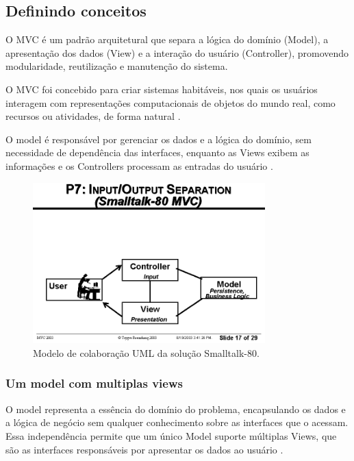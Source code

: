     \subsection{Definindo conceitos}
        \par O MVC é um padrão arquitetural que separa a lógica do domínio (Model), a apresentação dos dados (View) e a interação do usuário (Controller), promovendo modularidade, reutilização e manutenção do sistema\cite{artigo:reenskaug:2003}.

        \par O MVC foi concebido para criar sistemas habitáveis, nos quais os usuários interagem com representações computacionais de objetos do mundo real, como recursos ou atividades, de forma natural \cite{artigo:reenskaug:2003}.

        \par O model é responsável por gerenciar os dados e a lógica do domínio, sem necessidade de dependência das interfaces, enquanto as Views exibem as informações e os Controllers processam as entradas do usuário \cite{artigo:deacon:2009}.

        \begin{figure}[H] %
            \centering
            \includegraphics[width=0.8\textwidth]{figuras/figura_mvc_1.png}
            \caption{Modelo de colaboração UML da solução Smalltalk-80.}
            \label{fig:figura_mvc_1}
            \newcommand{\source}{Fonte: \cite{artigo:reenskaug:2003}}
        \end{figure}

        \subsubsection{Um model com multiplas views}
            \par O model representa a essência do domínio do problema, encapsulando os dados e a lógica de negócio sem qualquer conhecimento sobre as interfaces que o acessam. Essa independência permite que um único Model suporte múltiplas Views, que são as interfaces responsáveis por apresentar os dados ao usuário \cite{artigo:deacon:2009}.

